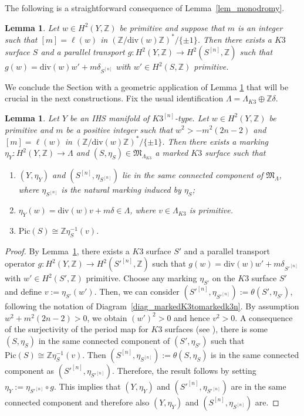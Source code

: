 \documentclass[12pt,a4paper]{amsart}
\theoremstyle{plain}
\newtheorem{lem}[thm]{Lemma}
\theoremstyle{definition}
\theoremstyle{remark}
\def\Pic{\mathrm{Pic}}
\def\Z{\mathbb{Z}}
\def\H{H}
\newcommand{\ZZ}{\mathbb{Z}}
\newcommand{\dv}{\mathrm{div}}
\newcommand{\Lambdan}{{\Lambda}}
\begin{document}
The following is a straightforward consequence of Lemma~\ref{lem_monodromy}.
\begin{lem}\label{lem_paralleltransporttohilb}
        Let $w\in \H^2(Y,\mathbb{Z})$ be primitive and suppose that $m$ is an integer such that $[m]= \ell(w)$ in $(\ZZ/\dv(w)\ZZ)^*/\{\pm 1\}$. Then there exists a $K3$ surface $S$ and a parallel transport $g\colon \H^2(Y,\mathbb{Z})\rightarrow \H^2(S^{[n]},\mathbb{Z})$ such that $g(w)=\mathrm{div}(w) w'+m\delta_{S^{[n]}}$ with $w'\in \H^2(S,\mathbb{Z})$ primitive.
    \end{lem}

    We conclude the Section with a geometric application of Lemma \ref{lem_paralleltransporttohilb} that will be crucial in the next constructions. Fix the usual identification $\Lambdan=\Lambda_{K3}\oplus\mathbb{Z}\delta$.
        \begin{lem}\label{markingexistence}
            Let $Y$ be an IHS manifold of $K3^{[n]}$-type. Let $w\in \H^2(Y,\mathbb{Z})$ be primitive and $m$ be a positive integer such that $w^2>-m^2(2n-2)$ and  $[m]=\ell(w)$ in $(\ZZ/\dv(w)\ZZ)^*/\{\pm 1\}$. Then there exists a marking $\eta_Y\colon \H^2(Y,\mathbb{Z})\rightarrow\Lambdan$ and $(S,\eta_S)\in\mathfrak{M}_{\Lambda_{K3}}$ a marked $K3$ surface such that
            \begin{enumerate}
                \item [{\normalfont{(1)}}] $(Y,\eta_Y)$ and $(S^{[n]},\eta_{S^{[n]}})$ lie in the same connected component of $\mathfrak{M}_\Lambdan$, where $\eta_{S^{[n]}}$ is the natural marking induced by $\eta_S$;
                \item [{\normalfont{(2)}}] $\eta_Y(w)=\dv(w)v+m\delta\in\Lambdan$, where $v\in\Lambda_{K3}$ is primitive.
                \item [{\normalfont{(3)}}] $\Pic(S)\cong \Z\eta_S^{-1}(v)$.
            \end{enumerate}
        \end{lem}
        \begin{proof}
    By Lemma~\ref{lem_paralleltransporttohilb}, there exists a $K3$ surface $S'$ and a parallel transport operator $g\colon \H^2(Y,\mathbb{Z})\rightarrow \H^2(S'^{[n]},\mathbb{Z})$ such that $g(w)=\mathrm{div}(w) w'+m\delta_{S'^{[n]}}$ with $w'\in \H^2(S',\mathbb{Z})$ primitive. Choose any marking $\eta_{S'}$ on the $K3$ surface $S'$ and define $v:=\eta_{S'}(w')$. Then, we can consider $(S'^{[n]},\eta_{S'^{[n]}}):=\theta(S',\eta_{S'})$, following the notation of Diagram~\ref{diag_markedK3tomarkedk3n}. By assumption $w^2+m^2(2n-2)>0$, we obtain $(w')^2>0$ and hence $v^2>0$.
    A consequence of the surjectivity of the period map for $K3$ surfaces (see \cite[Corollary 14.3.1]{HuyK3}), there is some $(S,\eta_S)$ in the same connected component of $(S',\eta_{S'})$ such that $\Pic(S)\cong \Z\eta_S^{-1}(v)$. Then $(S^{[n]},\eta_{S^{[n]}}):=\theta(S,\eta_S)$ is in the same connected component as $(S'^{[n]},\eta_{S'^{[n]}})$.
    Therefore, the result follows by setting $\eta_Y:=\eta_{S'^{[n]}}\circ g$. This implies that $(Y,\eta_Y)$ and $(S'^{[n]},\eta_{S'^{[n]}})$ are in the same connected component and therefore also $(Y,\eta_Y)$ and $(S^{[n]},\eta_{S^{[n]}})$ are.
\end{proof}
\end{document}
